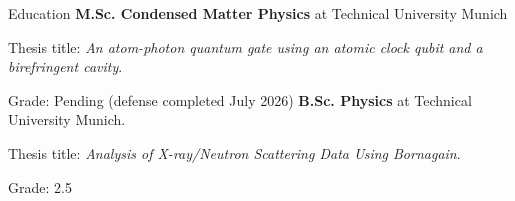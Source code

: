 \begin{rubric}{Education}
	\entry*[2024 -- 2026]%
	\textbf{M.Sc. Condensed Matter Physics} at Technical University Munich \par
	Thesis title: \emph{An atom-photon quantum gate using an atomic clock qubit and a birefringent cavity}.\par
	Grade: Pending (defense completed July 2026)
	\entry*[2020 -- 2023]%
	\textbf{B.Sc. Physics} at Technical University Munich.\par
	Thesis title: \emph{Analysis of X-ray/Neutron Scattering Data Using Bornagain}.\par
	Grade: 2.5
\end{rubric}
